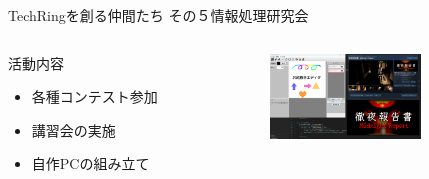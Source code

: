 \documentclass[dvipdfmx]{beamer}
\begin{document}
\begin{frame}{TechRingを創る仲間たち その５}{情報処理研究会}
  \begin{columns}
    \begin{column}{0.4\textwidth}
      \begin{block}{活動内容}
        \begin{itemize}
          \item 各種コンテスト参加
          \item 講習会の実施
          \item 自作PCの組み立て
        \end{itemize}
      \end{block}
    \end{column}
    \begin{column}{0.5\textwidth}
      \begin{center}
        \includegraphics[width=4cm]{pic/joken.png}
      \end{center}
    \end{column}
  \end{columns}

  \vspace{-2mm}


\end{frame}
\end{document}
